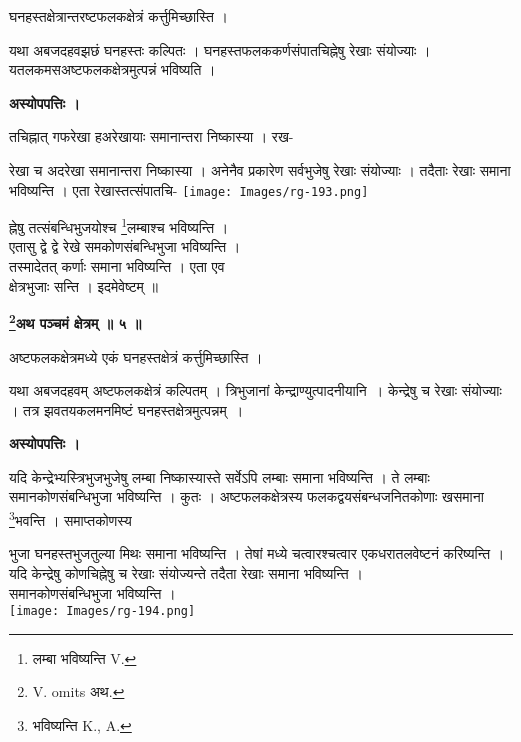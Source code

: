 \documentclass[11pt, openany]{book}
\begin{document}
 {\ab घनहस्तक्षेत्रान्तरष्टफलकक्षेत्रं कर्त्तुमिच्छास्ति ।  }\\
 \vspace{3mm}
 
 यथा अबजदहवझछं घनहस्तः कल्पितः । घनहस्तफलककर्णसंपातचिह्नेषु रेखाः संयोज्याः । यतलकमसअष्टफलकक्षेत्रमुत्पन्नं
भविष्यति ।\\
\begin{center}
\textbf{अस्योपपत्तिः ।}
\end{center}
\vspace{5mm}

तचिह्नात् गफरेखा हअरेखायाः समानान्तरा निष्कास्या । रख-

\newpage
\begin{vwcol}[widths={0.7,0.3}, sep=.8cm, rule=0pt]
रेखा च अदरेखा समानान्तरा निष्कास्या । अनेनैव प्रकारेण सर्वभुजेषु रेखाः संयोज्याः । तदैताः रेखाः समाना भविष्यन्ति । एता रेखास्तत्संपातचि-
\noindent \texttt{[image: Images/rg-193.png]}  
\end{vwcol}
\vspace{-15mm}

\noindent ह्नेषु तत्संबन्धिभुजयोश्च \renewcommand{\thefootnote}{१}\footnote{लम्बा भविष्यन्ति {\en V.}}लम्बाश्च भविष्यन्ति ।\\
एतासु द्वे द्वे  रेखे समकोणसंबन्धिभुजा भविष्यन्ति । \\
तस्मादेतत् कर्णाः समाना भविष्यन्ति । एता एव \\ क्षेत्रभुजाः सन्ति । इदमेवेष्टम् ॥\\
\vspace{5mm}

\begin{center}
\textbf{\large \renewcommand{\thefootnote}{२}\footnote{{\en V. omits} अथ.}अथ पञ्चमं क्षेत्रम् ॥ ५ ॥ }
\end{center}
\vspace{5mm}

{\ab अष्टफलकक्षेत्रमध्ये एकं घनहस्तक्षेत्रं कर्त्तुमिच्छास्ति ।}\\
\vspace{3mm}

यथा अबजदहवम् अष्टफलकक्षेत्रं कल्पितम् । त्रिभुजानां केन्द्राण्युत्पादनीयानि~। केन्द्रेषु च रेखाः संयोज्याः । तत्र झवतयकलमनमिष्टं घनहस्तक्षेत्रमुत्पन्नम्~।\\
\begin{center}
\textbf{अस्योपपत्तिः ।}
\end{center}
\vspace{5mm}

यदि केन्द्रेभ्यस्त्रिभुजभुजेषु लम्बा निष्कास्यास्ते सर्वेऽपि लम्बाः समाना भविष्यन्ति । ते लम्बाः समानकोणसंबन्धिभुजा भविष्यन्ति । कुतः । अष्टफलकक्षेत्रस्य फलकद्वयसंबन्धजनितकोणाः खसमाना \renewcommand{\thefootnote}{३}\footnote{भविष्यन्ति {\en K., A.}}भवन्ति । समाप्तकोणस्य
\begin{vwcol}[widths={0.7,0.3}, sep=.8cm, rule=0pt]
  भुजा घनहस्तभुजतुल्या मिथः समाना भविष्यन्ति । तेषां मध्ये चत्वारश्चत्वार एकधरातलवेष्टनं
करिष्यन्ति । यदि केन्द्रेषु कोणचिह्नेषु च रेखाः संयोज्यन्ते तदैता रेखाः समाना भविष्यन्ति ।\\  \noindent समानकोणसंबन्धिभुजा भविष्यन्ति ।\\
\noindent \texttt{[image: Images/rg-194.png]}  
\end{vwcol}
\end{document}
